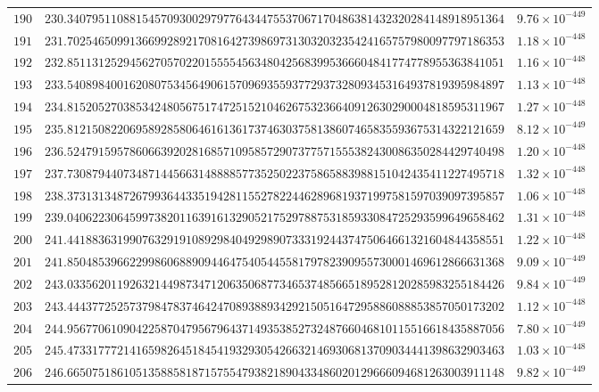 \documentclass[12pt,reqno]{amsart}
\theoremstyle{remark}
\begin{document}
\begin{longtable}{clc}
$190$ & $230.3407951108815457093002979776434475537067170486381432320284148918951364$ & $9.76\times 10^{-449}$ \\
$191$ & $231.7025465099136699289217081642739869731303203235424165757980097797186353$ & $1.18\times 10^{-448}$ \\
$192$ & $232.8511312529456270570220155554563480425683995366604841774778955363841051$ & $1.16\times 10^{-448}$ \\
$193$ & $233.5408984001620807534564906157096935593772937328093453164937819395984897$ & $1.13\times 10^{-448}$ \\
$194$ & $234.8152052703853424805675174725152104626753236640912630290004818595311967$ & $1.27\times 10^{-448}$ \\
$195$ & $235.8121508220695892858064616136173746303758138607465835593675314322121659$ & $8.12\times 10^{-449}$ \\
$196$ & $236.5247915957860663920281685710958572907377571555382430086350284429740498$ & $1.20\times 10^{-448}$ \\
$197$ & $237.7308794407348714456631488885773525022375865883988151042435411227495718$ & $1.32\times 10^{-448}$ \\
$198$ & $238.3731313487267993644335194281155278224462896819371997581597039097395857$ & $1.06\times 10^{-448}$ \\
$199$ & $239.0406223064599738201163916132905217529788753185933084725293599649658462$ & $1.31\times 10^{-448}$ \\
$200$ & $241.4418836319907632919108929840492989073331924437475064661321604844358551$ & $1.22\times 10^{-448}$ \\
$201$ & $241.8504853966229986068890944647540544558179782390955730001469612866631368$ & $9.09\times 10^{-449}$ \\
$202$ & $243.0335620119263214498734712063506877346537485665189528120285983255184426$ & $9.84\times 10^{-449}$ \\
$203$ & $243.4443772525737984783746424708938893429215051647295886088853857050173202$ & $1.12\times 10^{-448}$ \\
$204$ & $244.9567706109042258704795679643714935385273248766046810115516618435887056$ & $7.80\times 10^{-449}$ \\
$205$ & $245.4733177721416598264518454193293054266321469306813709034441398632903463$ & $1.03\times 10^{-448}$ \\
$206$ & $246.6650751861051358858187157554793821890433486020129666094681263003911148$ & $9.82\times 10^{-449}$ \\

\end{longtable}
\end{document}
